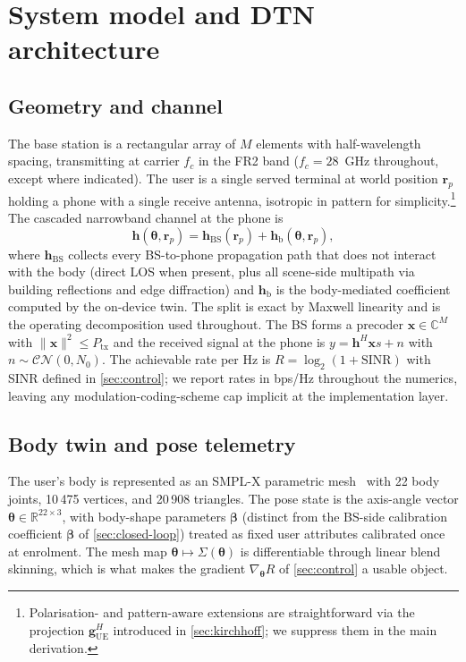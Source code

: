 \documentclass[journal,twocolumn,10pt]{IEEEtran}
\theoremstyle{plain}
\theoremstyle{definition}
\theoremstyle{remark}
\newcommand{\rr}{\mathbf{r}}
\newcommand{\xx}{\mathbf{x}}
\newcommand{\hh}{\bm{h}}
\newcommand{\thetab}{\bm{\theta}}
\newcommand{\betab}{\bm{\beta}}
\newcommand{\hBS}{\bm{h}_{\mathrm{BS}}}
\newcommand{\hbody}{\bm{h}_{\mathrm{b}}}
\newcommand{\Complex}{\mathbb{C}}
\newcommand{\Reals}{\mathbb{R}}
\begin{document}
\section{System model and DTN architecture}\label{sec:arch}

\subsection{Geometry and channel}

The base station is a rectangular array of $M$ elements with
half-wavelength spacing, transmitting at carrier $f_c$ in the FR2
band ($f_c = 28$~GHz throughout, except where indicated). The user
is a single served terminal at world position $\rr_p$ holding a
phone with a single receive antenna, isotropic in pattern for
simplicity.\footnote{Polarisation- and pattern-aware extensions are
straightforward via the projection $\bm{g}_{\mathrm{UE}}^{H}$
introduced in \cref{sec:kirchhoff}; we suppress them in the main
derivation.} The cascaded narrowband channel at the phone is
\begin{equation}\label{eq:cascaded}
\hh(\thetab,\rr_p) = \hBS(\rr_p) + \hbody(\thetab,\rr_p),
\end{equation}
where $\hBS$ collects every BS-to-phone propagation path that does
not interact with the body (direct LOS when present, plus all
scene-side multipath via building reflections and edge diffraction)
and $\hbody$ is the body-mediated coefficient computed by the
on-device twin. The split is exact by Maxwell linearity and is the
operating decomposition used throughout.
The BS forms a precoder $\xx \in \Complex^{M}$ with $\|\xx\|^2 \leq
P_{\mathrm{tx}}$ and the received signal at the phone is $y = \hh^{H}
\xx s + n$ with $n \sim \mathcal{CN}(0, N_0)$. The achievable rate per Hz is
$R = \log_2(1 + \mathrm{SINR})$ with SINR defined in
\cref{sec:control}; we report rates in bps/Hz throughout the
numerics, leaving any modulation-coding-scheme cap implicit at the
implementation layer.

\subsection{Body twin and pose telemetry}

The user's body is represented as an SMPL-X parametric
mesh~\cite{SMPLX2019} with 22 body joints, 10\,475 vertices, and
20\,908 triangles. The pose state is the axis-angle vector $\thetab
\in \Reals^{22 \times 3}$, with body-shape parameters $\bm{\beta}$
(distinct from the BS-side calibration coefficient $\betab$ of
\cref{sec:closed-loop}) treated as fixed user attributes calibrated
once at enrolment. The mesh map $\thetab \mapsto
\Sigma(\thetab)$ is differentiable through linear blend skinning,
which is what makes the gradient $\nabla_{\thetab} R$ of
\cref{sec:control} a usable object.
\end{document}

